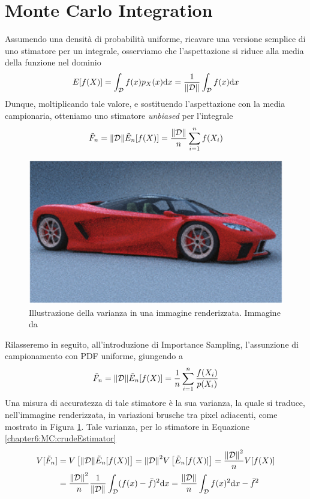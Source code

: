 \section{Monte Carlo Integration}
Assumendo una densit\`a di probabilit\`a uniforme, ricavare una versione semplice di uno stimatore per un integrale, osserviamo che l'aspettazione
si riduce alla media della funzione nel dominio
\begin{equation}
	E[f(X)]=\int_{\mathcal{D}}f(x)p_X(x)\mathrm{d}x=\frac{1}{\norm{\mathcal{D}}}\int_{\mathcal{D}}f(x)\mathrm{d}x
\end{equation}
Dunque, moltiplicando tale valore, e sostituendo l'aspettazione con la media campionaria, otteniamo uno stimatore \textit{unbiased}\footnotemark{} 
per l'integrale
\begin{equation}\label{chapter6:MC:crudeEstimator}
	\tilde{F}_n=\norm{\mathcal{D}}\tilde{E}_n[f(X)]=\frac{\norm{\mathcal{D}}}{n}\sum_{i=1}^nf(X_i)
\end{equation}
\begin{figure}[tb]
	\centering
	\includegraphics[width=0.7\linewidth]{../assets/chapter6_MC_variance.png}
	\caption{Illustrazione della varianza in una immagine renderizzata. Immagine da \cite{pharr}}
	\label{chapter6:MC:variance}
\end{figure}
Rilasseremo in seguito, all'introduzione di Importance Sampling, l'assunzione di campionamento con PDF uniforme, giungendo a
\begin{equation}\label{chapter6:MC:importanceEstimator}
	\tilde{F}_n=\norm{\mathcal{D}}\tilde{E}_n[f(X)]=\frac{1}{n}\sum_{i=1}^n\frac{f(X_i)}{p(X_i)}
\end{equation}
Una misura di accuratezza di tale stimatore \`e la sua varianza, la quale si traduce, nell'immagine renderizzata, in variazioni brusche tra pixel 
adiacenti, come mostrato in Figura \ref{chapter6:MC:variance}. Tale varianza\footnotemark{}, per lo stimatore in 
Equazione \ref{chapter6:MC:crudeEstimator}
\begin{align}\label{chapter6:MC:crudeVariance}
	V[\tilde{F}_n]&=V\left[\norm{\mathcal{D}}\tilde{E}_n[f(X)]\right]=\norm{\mathcal{D}}^2V\left[\tilde{E}_n[f(X)]\right]%
	=\frac{\norm{\mathcal{D}}^2}{n}V[f(X)] \\
	&=\frac{\norm{\mathcal{D}}^2}{n}\frac{1}{\norm{\mathcal{D}}}\int_{\mathcal{D}}(f(x)-\bar{f})^2\mathrm{d}x=
	\frac{\norm{\mathcal{D}}}{n}\int_{\mathcal{D}}f(x)^2\mathrm{d}x-\bar{f}^2 \nonumber
\end{align}
